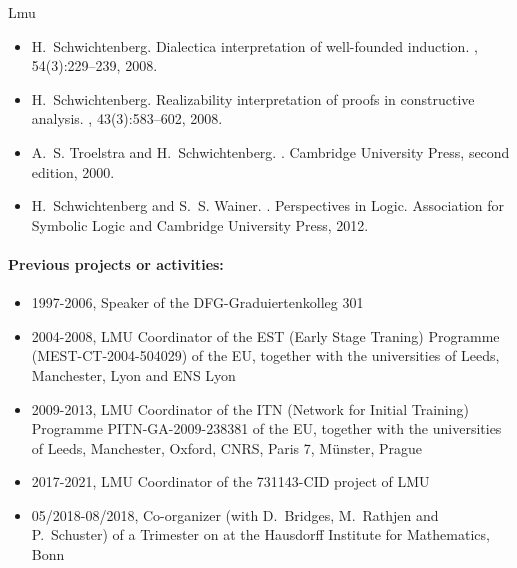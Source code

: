 \begin{sitedescription}{Lmu}
\begin{itemize}
\item H.~Schwichtenberg.
\newblock Dialectica interpretation of well-founded induction.
, 54(3):229--239, 2008.

\item H.~Schwichtenberg.
\newblock Realizability interpretation of proofs in constructive analysis.
, 43(3):583--602, 2008.

\item A.~S. Troelstra and H.~Schwichtenberg.
.
\newblock Cambridge University Press, second edition, 2000.

\item H.~Schwichtenberg and S.~S. Wainer.
.
\newblock Perspectives in Logic. Association for Symbolic Logic and Cambridge
  University Press, 2012.
\end{itemize}

\paragraph{Previous projects or activities:}

\begin{itemize}
  \item 1997-2006, Speaker of the DFG-Graduiertenkolleg 301

\item 2004-2008, LMU Coordinator of the  EST (Early Stage Traning) Programme
   (MEST-CT-2004-504029) of the EU, together with the
universities of Leeds, Manchester, Lyon and ENS Lyon

\item 2009-2013, LMU Coordinator of the ITN (Network for Initial
    Training) Programme PITN-GA-2009-238381  of the
    EU, together with the universities of Leeds, Manchester, Oxford,
    CNRS, Paris 7, M\"unster, Prague

\item 2017-2021, LMU Coordinator of the 731143-CID project of LMU

\item 05/2018-08/2018, Co-organizer (with D.~Bridges, M.~Rathjen and
  P.~Schuster) of a Trimester on 
  at the Hausdorff Institute for Mathematics, Bonn
\end{itemize}


\end{sitedescription}
